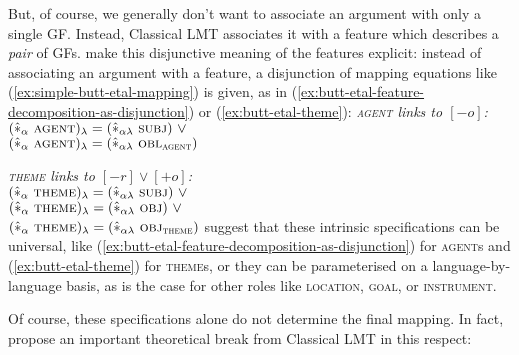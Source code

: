 \documentclass[output=paper]{langscibook}
\begin{document}
But, of course, we generally don't want to associate an argument with only a
single GF. Instead, Classical LMT associates it with a feature which describes a
\emph{pair} of GFs. \citet[6]{butt1997architecture} make this disjunctive
meaning of the features explicit: instead of associating an argument with a
feature, a disjunction of mapping equations like
(\ref{ex:simple-butt-etal-mapping}) is given, as in
(\ref{ex:butt-etal-feature-decomposition-as-disjunction}) or
(\ref{ex:butt-etal-theme}):%
%
\ea\label{ex:butt-etal-feature-decomposition-as-disjunction}
\textit{\textsc{agent} links to $[-o]$:}\\
                 $(\hat{*}_{\alpha}\ \textsc{agent})_{\lambda} = (\hat{*}_{\alpha\lambda}\ \textsc{subj}{})\ \lor$\\
                 $(\hat{*}_{\alpha}\ \textsc{agent})_{\lambda} = (\hat{*}_{\alpha\lambda}\ \textsc{obl}\textsubscript{\textsc{agent}}{})$
\z

\ea\label{ex:butt-etal-theme}
\textit{\textsc{theme} links to $[-r] \lor [+o]$:}\\
                 $(\hat{*}_{\alpha}\ \textsc{theme})_{\lambda} = (\hat{*}_{\alpha\lambda}\ \textsc{subj}{})\ \lor$\\
                 $(\hat{*}_{\alpha}\ \textsc{theme})_{\lambda} = (\hat{*}_{\alpha\lambda}\ \textsc{obj}{}{})\ \lor$\\
                 $(\hat{*}_{\alpha}\ \textsc{theme})_{\lambda} = (\hat{*}_{\alpha\lambda}\ \textsc{obj}\textsubscript{\textsc{theme}}{}) $
\z
%
\citet[6]{butt1997architecture} suggest that these intrinsic specifications can
be universal, like (\ref{ex:butt-etal-feature-decomposition-as-disjunction}) for
\textsc{agent}s and (\ref{ex:butt-etal-theme}) for \textsc{theme}s, or they can
be parameterised on a language-by-language basis, as is the case for other roles
like \textsc{location}, \textsc{goal}, or \textsc{instrument}.

%
Of course, these specifications alone do not determine the final mapping. In
fact, \citet[6]{butt1997architecture} propose an important theoretical break
from Classical LMT in this respect:
\end{document}
